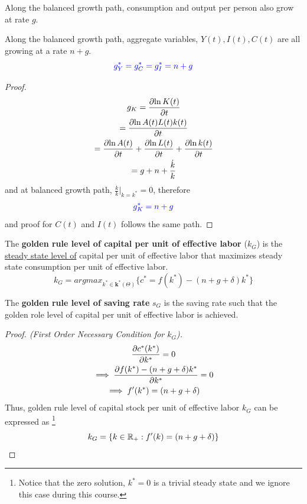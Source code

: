 \documentclass[]{article}
\begin{document}
			\begin{proposition}
				Along the balanced growth path, consumption and output per person also grow at rate $g$.
			\end{proposition}
			
			\begin{proposition}
				Along the balanced growth path, aggregate variables, $Y(t), I(t), C(t)$ are all growing at a rate $n + g$.
				\begin{equation}
					\textcolor{blue}{
						g_{Y}^* = g_{C}^* = g_{I}^* = n + g
						}
				\end{equation}
			\end{proposition}
			\begin{proof}
				\begin{gather*}
				g_{K} = \frac{\partial{\ln{K(t)}}}{\partial{t}} \\
				= \frac{\partial{\ln{A(t)L(t)k(t)}}}{\partial{t}} \\
				= \frac{\partial{\ln{A(t)}}}{\partial{t}} + \frac{\partial{\ln{L(t)}}}{\partial{t}} + \frac{\partial{\ln{k(t)}}}{\partial{t}} \\
				= g + n + \frac{\dot{k}}{k}
				\end{gather*}
				and at balanced growth path, $\frac{\dot{k}}{k}|_{k=k^*} = 0$, therefore 
				\begin{equation}
					\textcolor{blue}{
						g_K^* = n + g
					}
				\end{equation}
				and proof for $C(t)$ and $I(t)$ follows the same path.
			\end{proof}
		
		\begin{definition}
			The \textbf{golden rule level of capital per unit of effective labor} ($k_G$) is the \ul{steady state level of} capital per unit of effective labor that maximizes steady state consumption per unit of effective labor.
				\[
					k_G = argmax_{k^* \in \textbf{k}^*(\Theta)} \{c^* = f(k^*) - (n+g+ \delta) k^*\}
				\]
		\end{definition}
		
		\begin{definition}
			The \textbf{golden rule level of saving rate} $s_G$ is the saving rate such that the golden role level of capital per unit of effective labor is achieved.
		\end{definition}
		
		\begin{proof}[Proof. (First Order Necessary Condition for $k_G$)]
			\begin{gather*}
				\frac{\partial{c^*(k^*)}}{\partial{k^*}} = 0 \\
				\implies \frac{\partial{f(k^*) - (n+g+\delta)k^*}}{\partial{k^*}} = 0 \\
				\implies f'(k^*) = (n+g+\delta)
			\end{gather*}
			Thus, golden rule level of capital stock per unit of effective labor $k_G$ can be expressed as \footnote{Notice that the zero solution, $k^* = 0$ is a trivial steady state and we ignore this case during this course.}
			\begin{equation}
				k_G = \{k \in \mathbb{R}_{+}: f'(k) = (n+g+\delta)\}
			\end{equation}
		\end{proof}
		
\end{document}
